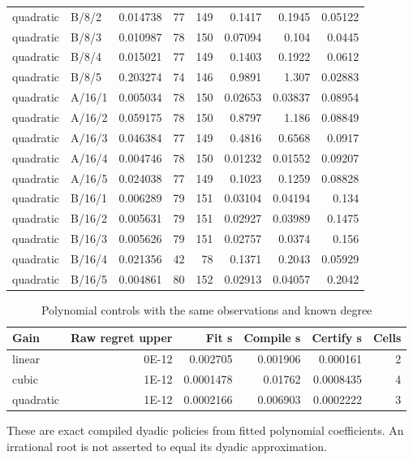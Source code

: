 \begin{longtable}{llrrrrrr}
quadratic & B/8/2 & 0.014738 & 77 & 149 & 0.1417 & 0.1945 & 0.05122 \\
quadratic & B/8/3 & 0.010987 & 78 & 150 & 0.07094 & 0.104 & 0.0445 \\
quadratic & B/8/4 & 0.015021 & 77 & 149 & 0.1403 & 0.1922 & 0.0612 \\
quadratic & B/8/5 & 0.203274 & 74 & 146 & 0.9891 & 1.307 & 0.02883 \\
quadratic & A/16/1 & 0.005034 & 78 & 150 & 0.02653 & 0.03837 & 0.08954 \\
quadratic & A/16/2 & 0.059175 & 78 & 150 & 0.8797 & 1.186 & 0.08849 \\
quadratic & A/16/3 & 0.046384 & 77 & 149 & 0.4816 & 0.6568 & 0.0917 \\
quadratic & A/16/4 & 0.004746 & 78 & 150 & 0.01232 & 0.01552 & 0.09207 \\
quadratic & A/16/5 & 0.024038 & 77 & 149 & 0.1023 & 0.1259 & 0.08828 \\
quadratic & B/16/1 & 0.006289 & 79 & 151 & 0.03104 & 0.04194 & 0.134 \\
quadratic & B/16/2 & 0.005631 & 79 & 151 & 0.02927 & 0.03989 & 0.1475 \\
quadratic & B/16/3 & 0.005626 & 79 & 151 & 0.02757 & 0.0374 & 0.156 \\
quadratic & B/16/4 & 0.021356 & 42 & 78 & 0.1371 & 0.2043 & 0.05929 \\
quadratic & B/16/5 & 0.004861 & 80 & 152 & 0.02913 & 0.04057 & 0.2042 \\
\end{longtable}\endgroup
\begin{table}[htbp]
\centering\footnotesize
\caption{Polynomial controls with the same observations and known degree}\label{tab:poly30}
\begin{tabular}{lrrrrr}\toprule
Gain & Raw regret upper & Fit s & Compile s & Certify s & Cells \\\midrule
linear & 0E-12 & 0.002705 & 0.001906 & 0.000161 & 2 \\
cubic & 1E-12 & 0.0001478 & 0.01762 & 0.0008435 & 4 \\
quadratic & 1E-12 & 0.0002166 & 0.006903 & 0.0002222 & 3 \\
\bottomrule\end{tabular}
\par\smallskip\begin{minipage}{.98\textwidth}\footnotesize These are exact compiled dyadic policies from fitted polynomial coefficients. An irrational root is not asserted to equal its dyadic approximation.\end{minipage}
\end{table}
